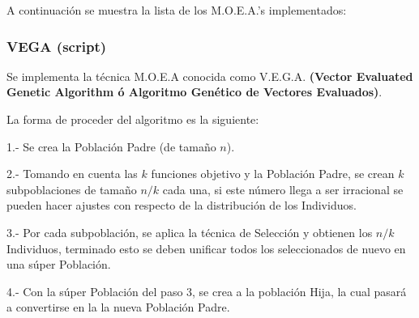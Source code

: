 \documentclass[letterpaper,10pt,english]{sphinxmanual}
\begin{document}
A continuación se muestra la lista de los M.O.E.A.'s implementados:


\subsubsection{VEGA (script)}
\label{Model/MOEA/VEGA:vega-script}\label{Model/MOEA/VEGA::doc}
\begin{DUlineblock}{0em}
\item[] Se implementa la técnica M.O.E.A conocida como V.E.G.A. \textbf{(Vector Evaluated Genetic
Algorithm ó Algoritmo Genético de Vectores Evaluados)}.
\item[] La forma de proceder del algoritmo es la siguiente:
\item[] 
\item[] 1.- Se crea la Población Padre (de tamaño \(n\)).
\end{DUlineblock}

\begin{DUlineblock}{0em}
\item[] 2.- Tomando en cuenta las \(k\) funciones objetivo y la Población Padre, se crean \(k\) subpoblaciones de tamaño \(n/k\) cada una, si este número llega a ser irracional se pueden hacer ajustes con respecto de la distribución de los Individuos.
\end{DUlineblock}

\begin{DUlineblock}{0em}
\item[] 3.- Por cada subpoblación, se aplica la técnica de Selección y obtienen los \(n/k\) Individuos, terminado esto se deben unificar todos los seleccionados de nuevo en una súper Población.
\end{DUlineblock}

\begin{DUlineblock}{0em}
\item[] 4.- Con la súper Población del paso 3, se crea a la población Hija, la cual pasará a convertirse en la la nueva Población Padre.
\end{DUlineblock}
\end{document}
